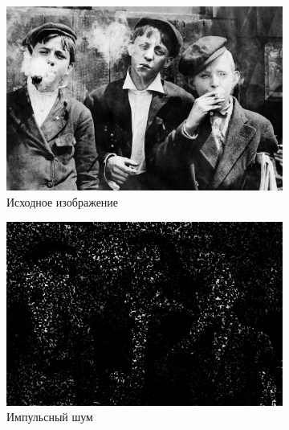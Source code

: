 \begin{figure}[ht] 
    \centering
    \begin{subfigure}[b]{0.5\linewidth}
        \centering
        \includegraphics[width=0.95\linewidth]{../lewis-hine-taschen-main-3.jpg} 
        \caption{Исходное изображение} 
        \label{rang_5_1:a} 
        \vspace{4ex}
    \end{subfigure}%
    \begin{subfigure}[b]{0.5\linewidth}
      \centering
      \includegraphics[width=0.95\linewidth]{../Rang_Filter/Rang_Impulse_noise_(k=5,r=1).jpg} 
      \caption{Импульсный шум} 
      \label{rang_5_1:b} 
      \vspace{4ex}
    \end{subfigure}
    \begin{subfigure}[b]{0.5\linewidth}
      \centering

\end{subfigure}
\end{figure}
